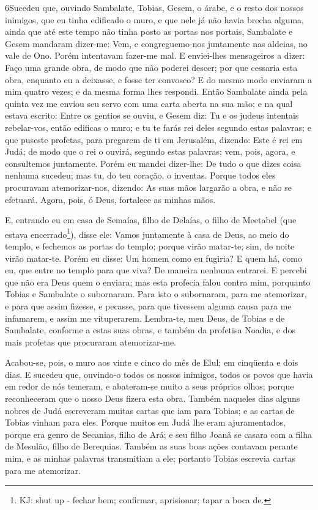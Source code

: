 \lettrine{6} Sucedeu que, ouvindo Sambalate, Tobias, Gesem, o
árabe, e o resto dos nossos inimigos, que eu tinha edificado o muro,
e que nele já não havia brecha alguma, ainda que até este tempo não
tinha posto as portas nos portais, Sambalate e Gesem mandaram
dizer-me: Vem, e congreguemo-nos juntamente nas aldeias, no vale de
Ono. Porém intentavam fazer-me mal. E enviei-lhes mensageiros a
dizer: Faço uma grande obra, de modo que não poderei descer; por que
cessaria esta obra, enquanto eu a deixasse, e fosse ter convosco?
E do mesmo modo enviaram a mim quatro vezes; e da mesma forma
lhes respondi. Então Sambalate ainda pela quinta vez me enviou
seu servo com uma carta aberta na sua mão; e na qual estava
escrito: Entre os gentios se ouviu, e Gesem diz: Tu e os judeus
intentais rebelar-vos, então edificas o muro; e tu te farás rei
deles segundo estas palavras; e que puseste profetas, para
pregarem de ti em Jerusalém, dizendo: Este é rei em Judá; de modo
que o rei o ouvirá, segundo estas palavras; vem, pois, agora, e
consultemos juntamente. Porém eu mandei dizer-lhe: De tudo o que
dizes coisa nenhuma sucedeu; mas tu, do teu coração, o inventas.
Porque todos eles procuravam atemorizar-nos, dizendo: As suas
mãos largarão a obra, e não se efetuará. Agora, pois, ó Deus,
fortalece as minhas mãos.

E, entrando eu em casa de Semaías, filho de Delaías, o filho de
Meetabel (que estava encerrado\footnote{KJ: shut up - fechar bem;
confirmar, aprisionar; tapar a boca de.}), disse ele: Vamos
juntamente à casa de Deus, ao meio do templo, e fechemos as portas
do templo; porque virão matar-te; sim, de noite virão matar-te.
Porém eu disse: Um homem como eu fugiria? E quem há, como eu,
que entre no templo para que viva? De maneira nenhuma entrarei.
E percebi que não era Deus quem o enviara; mas esta profecia
falou contra mim, porquanto Tobias e Sambalate o subornaram.
Para isto o subornaram, para me atemorizar, e para que assim
fizesse, e pecasse, para que tivessem alguma causa para me
infamarem, e assim me vituperarem. Lembra-te, meu Deus, de
Tobias e de Sambalate, conforme a estas suas obras, e também da
profetisa Noadia, e dos mais profetas que procuraram atemorizar-me.

Acabou-se, pois, o muro aos vinte e cinco do mês de Elul; em
cinqüenta e dois dias. E sucedeu que, ouvindo-o todos os
nossos inimigos, todos os povos que havia em redor de nós temeram, e
abateram-se muito a seus próprios olhos; porque reconheceram que o
nosso Deus fizera esta obra. Também naqueles dias alguns
nobres de Judá escreveram muitas cartas que iam para Tobias; e as
cartas de Tobias vinham para eles. Porque muitos em Judá lhe
eram ajuramentados, porque era genro de Secanias, filho de Ará; e
seu filho Joanã se casara com a filha de Mesulão, filho de
Berequias. Também as suas boas ações contavam perante mim, e
as minhas palavras transmitiam a ele; portanto Tobias escrevia
cartas para me atemorizar.

